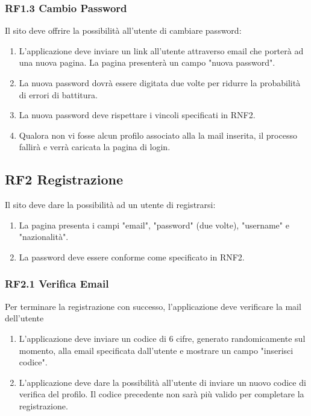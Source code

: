 \documentclass{report}
\begin{document}
\subsubsection*{RF1.3 Cambio Password}
Il sito deve offrire la possibilità all’utente di cambiare password:
	\begin{enumerate}
		\item L'applicazione deve inviare un link all'utente attraverso email che porterà ad una nuova pagina. La pagina presenterà un campo "nuova password".
		
		\item La nuova password dovrà essere digitata due volte per ridurre la probabilità di errori di battitura.
		
		\item La nuova password deve rispettare i vincoli specificati in RNF2.
		
		\item Qualora non vi fosse alcun profilo associato alla la mail inserita, il processo fallirà e verrà caricata la pagina di login.
	\end{enumerate}


\subsection*{RF2 Registrazione}
Il sito deve dare la possibilità ad un utente di registrarsi:
\begin{enumerate}
	\item La pagina presenta i campi "email", "password" (due volte), "username" e "nazionalità". 
	\item La password deve essere conforme come specificato in RNF2.
\end{enumerate}

\subsubsection*{RF2.1 Verifica Email}
Per terminare la registrazione con successo, l'applicazione deve verificare la mail dell'utente

\begin{enumerate}
	\item L'applicazione deve inviare un codice di 6 cifre, generato randomicamente sul momento, alla email specificata dall’utente e mostrare un campo "inserisci codice".
		
	\item L'applicazione deve dare la possibilità all’utente di inviare un nuovo codice di verifica del profilo. Il codice precedente non sarà più valido per completare la registrazione.
		
\end{enumerate}
\end{document}
